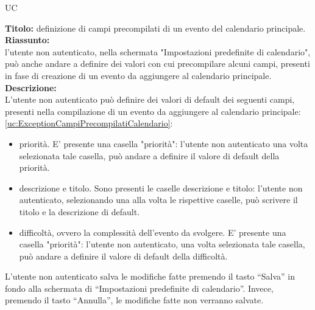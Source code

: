 \begin{listaPersonale}{UC}
\begin{listaPersonale2}[UC] {}
            \newpage
            \textbf{Titolo: } definizione di campi precompilati di un evento del calendario principale. \\
            \textbf{Riassunto: } \\ l'utente non autenticato, nella schermata "Impostazioni predefinite di calendario", può anche andare a definire dei valori con cui precompilare alcuni campi, presenti in fase di creazione di un evento da aggiungere al calendario principale. \\
            \textbf{Descrizione: } \\
            L'utente non autenticato può definire dei valori di default dei seguenti campi, presenti nella compilazione di un evento da aggiungere al calendario principale: \ref{uc:ExceptionCampiPrecompilatiCalendario}:
            \begin{itemize}
                \item priorità. E' presente una casella "priorità": l'utente non autenticato una volta selezionata tale casella, può andare a definire il valore di default della priorità.
                \item descrizione e titolo. Sono presenti le caselle descrizione e titolo: l'utente non autenticato, selezionando una alla volta le rispettive caselle, può scrivere il titolo e la descrizione di default.
                \item difficoltà, ovvero la complessità dell'evento da svolgere. E' presente una casella "priorità": l'utente non autenticato, una volta selezionata tale casella, può andare a definire il valore di default della difficoltà.
            \end{itemize}
            L'utente non autenticato salva le modifiche fatte premendo il tasto “Salva” in fondo alla schermata di “Impostazioni predefinite di calendario”. Invece, premendo il tasto “Annulla”, le modifiche fatte non verranno salvate.


\end{listaPersonale2}
\end{listaPersonale}
